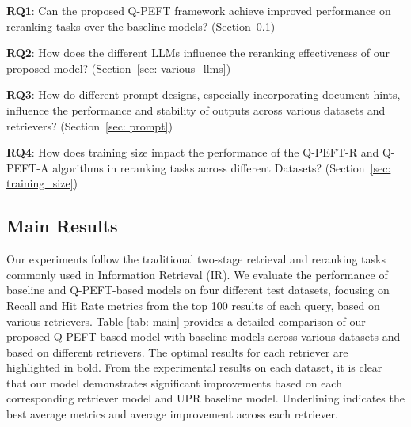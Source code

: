 \documentclass[sigconf,natbib=true,anonymous=false]{acmart}
\begin{document}
\textbf{RQ1}: Can the proposed Q-PEFT framework achieve improved performance on reranking tasks over the baseline models? (Section~\ref{sec: main_results})

\textbf{RQ2}: How does the different LLMs influence the reranking effectiveness of our proposed model? (Section~\ref{sec: various_llms})

\textbf{RQ3}: How do different prompt designs, especially incorporating document hints, influence the performance and stability of outputs across various datasets and retrievers? (Section~\ref{sec: prompt})

\textbf{RQ4}: How does training size impact the performance of the Q-PEFT-R and Q-PEFT-A algorithms in reranking tasks across different Datasets? (Section~\ref{sec: training_size})

\subsection{Main Results}
\label{sec: main_results}

Our experiments follow the traditional two-stage retrieval and reranking tasks commonly used in Information Retrieval (IR). We evaluate the performance of baseline and Q-PEFT-based models on four different test datasets, focusing on Recall and Hit Rate metrics from the top 100 results of each query, based on various retrievers. Table \ref{tab: main} provides a detailed comparison of our proposed Q-PEFT-based model with baseline models across various datasets and based on different retrievers. The optimal results for each retriever are highlighted in bold. From the experimental results on each dataset, it is clear that our model demonstrates significant improvements based on each corresponding retriever model and UPR baseline model. Underlining indicates the best average metrics and average improvement across each retriever.
\end{document}
